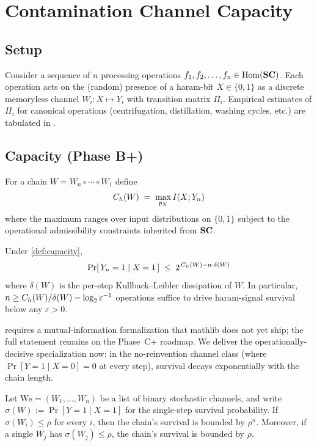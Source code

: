 \section{Contamination Channel Capacity}
\label{sec:capacity}

\subsection{Setup}

Consider a sequence of $n$ processing operations
$f_1, f_2, \dotsc, f_n \in \mathrm{Hom}(\mathbf{SC})$. Each operation acts on
the (random) presence of a haram-bit $X \in \{0,1\}$ as a discrete
memoryless channel $W_i \colon X \mapsto Y_i$ with transition matrix
$\Pi_i$. Empirical estimates of $\Pi_i$ for canonical operations
(centrifugation, distillation, washing cycles, etc.) are tabulated in
.

\subsection{Capacity (Phase B+)}

\begin{definition}
\label{def:capacity}
For a chain $W = W_n \circ \dotsb \circ W_1$ define
\[
   C_{h}(W) \;=\; \max_{p_X} I(X; Y_n)
\]
where the maximum ranges over input distributions on
$\{0,1\}$ subject to the operational admissibility constraints inherited
from $\mathbf{SC}$.
\end{definition}

\begin{theorem}
\label{thm:survival}
Under \cref{def:capacity},
\[
   \Pr[\, Y_n = 1 \mid X = 1 \,]
   \;\leq\; 2^{\,C_{h}(W) - n \cdot \delta(W)}
\]
where $\delta(W)$ is the per-step Kullback--Leibler dissipation of $W$.
In particular, $n \geq C_{h}(W) / \delta(W) - \log_2 \varepsilon^{-1}$
operations suffice to drive haram-signal survival below any
$\varepsilon > 0$.
\end{theorem}

 requires a mutual-information formalization that
mathlib does not yet ship; the full statement remains on the Phase~C+
roadmap. We deliver the operationally-decisive specialization now: in
the no-reinvention channel class (where $\Pr[Y=1 \mid X=0] = 0$ at
every step), survival decays exponentially with the chain length.

\begin{theorem}
\label{thm:survival-exp}
Let $\mathrm{Ws} = (W_1, \dotsc, W_n)$ be a list of binary stochastic
channels, and write $\sigma(W) := \Pr[Y=1 \mid X=1]$ for the
single-step survival probability. If $\sigma(W_i) \leq \rho$ for every
$i$, then the chain's survival is bounded by $\rho^n$. Moreover, if a
single $W_j$ has $\sigma(W_j) \leq \rho$, the chain's survival is
bounded by $\rho$.
\end{theorem}

